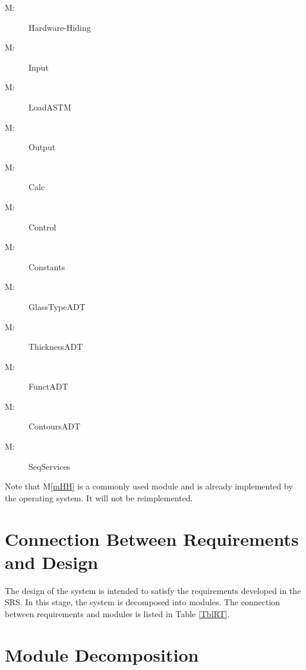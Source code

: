 \documentclass[12pt]{article}
\newcounter{mnum}
\newcommand{\mthemnum}{M\themnum}
\newcommand{\mref}[1]{M\ref{#1}}
\begin{document}
\begin{description}
\item [ \mthemnum \label{mHH}:] Hardware-Hiding
\item [ \mthemnum \label{mParams}:] Input
\item [ \mthemnum \label{mLoad}:] LoadASTM
\item [ \mthemnum \label{mOutput}:] Output
\item [ \mthemnum \label{mCalc}:]  Calc
\item [ \mthemnum \label{mControl}:] Control
\item [ \mthemnum \label{mConstants}:] Constants
\item [ \mthemnum \label{mGlassType}:] GlassTypeADT
\item [ \mthemnum \label{mThickness}:] ThicknessADT
\item [ \mthemnum \label{mFunctADT}:] FunctADT
\item [ \mthemnum \label{mContoursADT}:] ContoursADT
\item [ \mthemnum \label{mSeqServices}:] SeqServices
\end{description}

Note that \mref{mHH} is a commonly used module and is already implemented by 
the operating system.  It will not be reimplemented.

\section{Connection Between Requirements and Design} \label{SecConnection}

The design of the system is intended to satisfy the requirements developed in
the SRS. In this stage, the system is decomposed into modules. The connection
between requirements and modules is listed in Table \ref{TblRT}.

\section{Module Decomposition} \label{SecMD}
\end{document}
